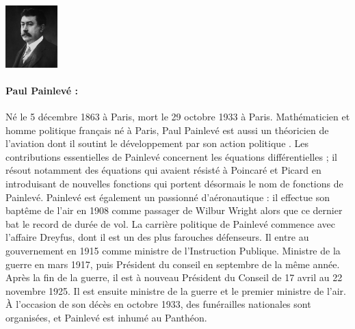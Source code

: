 \begin{minipage}{0.2\linewidth}
\begin{center}\includegraphics[width=2cm]{images/painleve.jpg}\end{center}
\end{minipage}
\begin{minipage}{0.8\linewidth}
\small{\paragraph*{Paul Painlevé :}Né le 5 décembre 1863 à Paris, mort le 29 octobre 1933 à Paris. Mathématicien et homme politique français né à Paris, Paul Painlevé est aussi un théoricien de l'aviation dont il soutint le développement par son action politique \cite{borel1911aviation}. Les contributions essentielles de Painlevé concernent les équations différentielles ; il résout notamment des équations qui avaient résisté à Poincaré et Picard en introduisant de nouvelles fonctions qui portent désormais le nom de fonctions de Painlevé. Painlevé est également un passionné d'aéronautique : il effectue son baptême de l'air en 1908 comme passager de Wilbur Wright alors que ce dernier bat le record de durée de vol. La carrière politique de Painlevé commence avec l'affaire Dreyfus, dont il est un des plus farouches défenseurs. Il entre au gouvernement en 1915 comme ministre de l'Instruction Publique. Ministre de la guerre en mars 1917, puis Président du conseil en septembre de la même année. Après la fin de la guerre, il est à nouveau Président du Conseil de 17 avril au 22 novembre 1925. Il est ensuite ministre de la guerre et le premier ministre de l'air. À l'occasion de son décès en octobre 1933, des funérailles nationales sont organisées, et Painlevé est inhumé au Panthéon.}
\end{minipage}
\vfill
